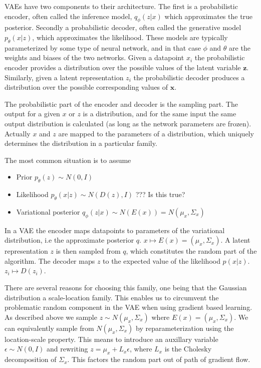 \documentclass[../../thesis.tex]{subfiles}
\begin{document}
VAEs have two components to their architecture. The first is a probabilistic encoder, often called the inference model, $q_\phi(z|x)$ which approximates the true posterior. Secondly a probabilistic decoder, often called the generative model $p_\theta(x|z)$, which approximates the likelihood. These models are typically parameterized by some type of neural network, and in that case $\phi$ and $\theta$ are the weights and biases of the two networks. Given a datapoint $x_i$ the probabilistic encoder provides a distribution over the possible values of the latent variable $\mathbf{z}$. Similarly, given a latent representation $z_i$ the probabilistic decoder produces a distribution over the possible corresponding values of $\mathbf{x}$. \newline

The probabilistic part of the encoder and decoder is the sampling part. The output for a given $x$ or $z$ is a distribution, and for the same input the same output distribution is calculated (as long as the network parameters are frozen). Actually $x$ and $z$ are mapped to the parameters of a distribution, which uniquely determines the distribution in a particular family.\newline

The most common situation is to assume 
\begin{itemize}
    \item Prior $p_\theta(z)\sim N(0,I)$
    \item Likelihood $p_\theta(x|z)\sim N(D(z), I)$ ??? Is this true? 
    \item Variational posterior $q_\phi(z|x)\sim N(E(x)) = N(\mu_x, \Sigma_x)$
\end{itemize}

In a VAE the encoder maps datapoints to parameters of the variational distribution, i.e the approximate posterior $q$. $x \mapsto E(x) = (\mu_x, \Sigma_x)$. A latent representation $z$ is then sampled from $q$, which constitutes the random part of the algorithm. The decoder maps $z$ to the expected value of the likelihood $p(x|z)$. $z_i \mapsto D(z_i)$. \newline

There are several reasons for choosing this family, one being that the Gaussian distribution a scale-location family. This enables us to circumvent the problematic random component in the VAE when using gradient based learning. As described above we sample $z\sim N(\mu_x,\Sigma_x)$ where $E(x) = (\mu_x,\Sigma_x)$. We can equivalently sample from $N(\mu_x,\Sigma_x)$ by reparameterization using the location-scale property. This means to introduce an auxillary variable $\epsilon \sim N(0,I)$ and rewriting $z = \mu_x + L_x\epsilon $, where $L_x$ is the Cholesky decomposition of $\Sigma_x$. This factors the random part out of path of gradient flow.\newline
{}
\end{document}
